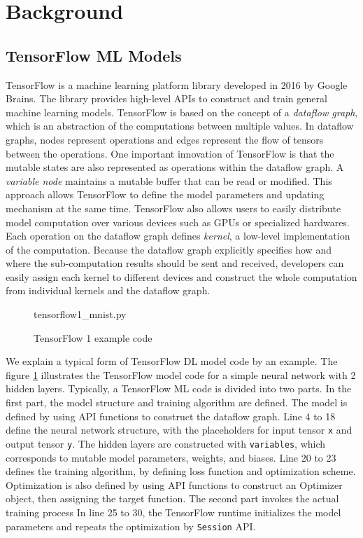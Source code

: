 \section{Background}\label{sec:background}
\subsection{TensorFlow ML Models}

TensorFlow\cite{tensorflow} is a machine learning platform library
developed in 2016 by Google Brains.
The library provides high-level APIs to construct and 
train general machine learning models.
TensorFlow is based on the concept of a \textit{dataflow graph},
which is an abstraction of the computations between
multiple values.
In dataflow graphs, nodes represent operations and
edges represent the flow of tensors between the operations.
One important innovation of TensorFlow
is that the mutable states are also represented as operations
within the dataflow graph. 
A \textit{variable node} maintains a mutable buffer that can be read or modified.
This approach allows TensorFlow to define the model parameters
and updating mechanism at the same time.
TensorFlow also allows users to easily distribute model computation over
various devices such as GPUs or specialized hardwares.
Each operation on the dataflow graph defines \textit{kernel},
a low-level implementation of the computation.
Because the dataflow graph explicitly specifies how
and where the sub-computation results should be sent and received,
developers can easily assign each kernel to different devices and construct
the whole computation from individual kernels and the dataflow graph.

\begin{figure}[ht!]

{tensorflow1_mnist.py}
\caption{TensorFlow 1 example code}
\label{fig:back:tf1}
\end{figure}

We explain a typical form of TensorFlow DL model code by an example.
The figure \ref{fig:back:tf1} illustrates the TensorFlow model code for
a simple neural network with 2 hidden layers.
Typically, a TensorFlow ML code is divided into two parts.
In the first part, the model structure and training algorithm are defined.
The model is defined by using API functions to construct the dataflow graph.
Line 4 to 18 define the neural network structure,
with the placeholders for input tensor {\tt x} and output tensor {\tt y}.
The hidden layers are constructed with {\tt variables},
which corresponds to mutable model parameters, weights, and biases.  
Line 20 to 23 defines the training algorithm, 
by defining loss function and optimization scheme.
Optimization is also defined by using API functions to construct
an Optimizer object, then assigning the target function.
The second part invokes the actual training process
In line 25 to 30, the TensorFlow runtime initializes the model parameters
and repeats the optimization by {\tt Session} API. 

